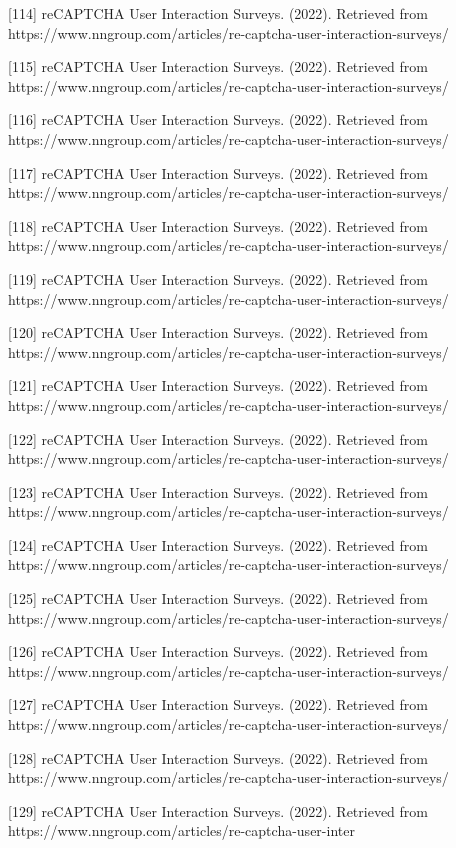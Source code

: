[114] reCAPTCHA User Interaction Surveys. (2022). Retrieved from https://www.nngroup.com/articles/re-captcha-user-interaction-surveys/ 

[115] reCAPTCHA User Interaction Surveys. (2022). Retrieved from https://www.nngroup.com/articles/re-captcha-user-interaction-surveys/ 

[116] reCAPTCHA User Interaction Surveys. (2022). Retrieved from https://www.nngroup.com/articles/re-captcha-user-interaction-surveys/ 

[117] reCAPTCHA User Interaction Surveys. (2022). Retrieved from https://www.nngroup.com/articles/re-captcha-user-interaction-surveys/ 

[118] reCAPTCHA User Interaction Surveys. (2022). Retrieved from https://www.nngroup.com/articles/re-captcha-user-interaction-surveys/ 

[119] reCAPTCHA User Interaction Surveys. (2022). Retrieved from https://www.nngroup.com/articles/re-captcha-user-interaction-surveys/ 

[120] reCAPTCHA User Interaction Surveys. (2022). Retrieved from https://www.nngroup.com/articles/re-captcha-user-interaction-surveys/ 

[121] reCAPTCHA User Interaction Surveys. (2022). Retrieved from https://www.nngroup.com/articles/re-captcha-user-interaction-surveys/ 

[122] reCAPTCHA User Interaction Surveys. (2022). Retrieved from https://www.nngroup.com/articles/re-captcha-user-interaction-surveys/ 

[123] reCAPTCHA User Interaction Surveys. (2022). Retrieved from https://www.nngroup.com/articles/re-captcha-user-interaction-surveys/ 

[124] reCAPTCHA User Interaction Surveys. (2022). Retrieved from https://www.nngroup.com/articles/re-captcha-user-interaction-surveys/ 

[125] reCAPTCHA User Interaction Surveys. (2022). Retrieved from https://www.nngroup.com/articles/re-captcha-user-interaction-surveys/ 

[126] reCAPTCHA User Interaction Surveys. (2022). Retrieved from https://www.nngroup.com/articles/re-captcha-user-interaction-surveys/ 

[127] reCAPTCHA User Interaction Surveys. (2022). Retrieved from https://www.nngroup.com/articles/re-captcha-user-interaction-surveys/ 

[128] reCAPTCHA User Interaction Surveys. (2022). Retrieved from https://www.nngroup.com/articles/re-captcha-user-interaction-surveys/ 

[129] reCAPTCHA User Interaction Surveys. (2022). Retrieved from https://www.nngroup.com/articles/re-captcha-user-inter